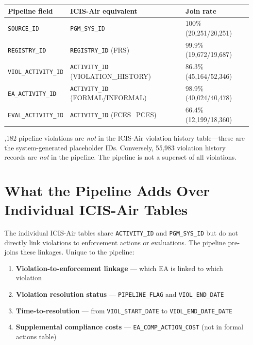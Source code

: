 \documentclass[11pt]{article}
\begin{document}
\begin{table}[H]
\centering
\begin{tabular}{lll}
\toprule
Pipeline field & ICIS-Air equivalent & Join rate \\
\midrule
\texttt{SOURCE\_ID} & \texttt{PGM\_SYS\_ID} & 100\% (20,251/20,251) \\
\texttt{REGISTRY\_ID} & \texttt{REGISTRY\_ID} (FRS) & 99.9\% (19,672/19,687) \\
\texttt{VIOL\_ACTIVITY\_ID} & \texttt{ACTIVITY\_ID} (VIOLATION\_HISTORY) & 86.3\% (45,164/52,346) \\
\texttt{EA\_ACTIVITY\_ID} & \texttt{ACTIVITY\_ID} (FORMAL/INFORMAL) & 98.9\% (40,024/40,478) \\
\texttt{EVAL\_ACTIVITY\_ID} & \texttt{ACTIVITY\_ID} (FCES\_PCES) & 66.4\% (12,199/18,360) \\
\bottomrule
\end{tabular}
\end{table}

,182 pipeline violations are \emph{not} in the ICIS-Air violation history table---these are the system-generated placeholder IDs. Conversely, 55,983 violation history records are \emph{not} in the pipeline. The pipeline is not a superset of all violations.

\section{What the Pipeline Adds Over Individual ICIS-Air Tables}

The individual ICIS-Air tables share \texttt{ACTIVITY\_ID} and \texttt{PGM\_SYS\_ID} but do not directly link violations to enforcement actions or evaluations. The pipeline pre-joins these linkages. Unique to the pipeline:

\begin{enumerate}[nosep]
  \item \textbf{Violation-to-enforcement linkage} --- which EA is linked to which violation
  \item \textbf{Violation resolution status} --- \texttt{PIPELINE\_FLAG} and \texttt{VIOL\_END\_DATE}
  \item \textbf{Time-to-resolution} --- from \texttt{VIOL\_START\_DATE} to \texttt{VIOL\_END\_DATE\_DATE}
  \item \textbf{Supplemental compliance costs} --- \texttt{EA\_COMP\_ACTION\_COST} (not in formal actions table)
\end{enumerate}
\end{document}
